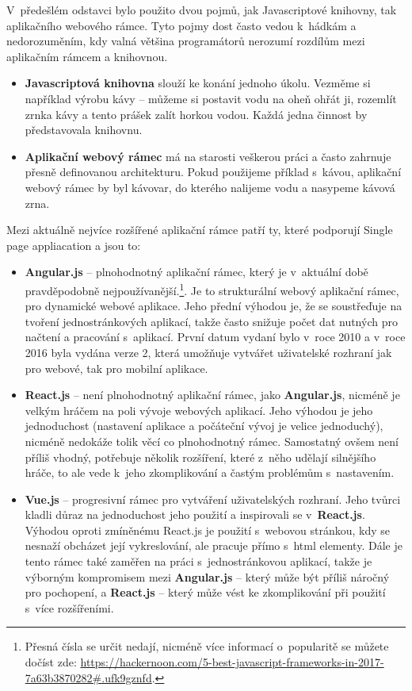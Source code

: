 \par V~předešlém odstavci bylo použito dvou pojmů, jak Javascriptové knihovny, tak aplikačního webového rámce. Tyto pojmy dost často vedou k~hádkám a nedorozuměním, kdy valná většina programátorů nerozumí rozdílům mezi aplikačním rámcem a knihovnou.
\begin{itemize}
\item \textbf{Javascriptová knihovna} slouží ke konání jednoho úkolu. Vezměme si například výrobu kávy -- můžeme si postavit vodu na oheň ohřát ji, rozemlít zrnka kávy a tento prášek zalít horkou vodou. Každá jedna činnost by představovala knihovnu.
\item \textbf{Aplikační webový rámec} má na starosti veškerou práci a často zahrnuje přesně definovanou architekturu. Pokud použijeme příklad s~kávou, aplikační webový rámec by byl kávovar, do kterého nalijeme vodu a nasypeme kávová zrna. \cite{framework-vs-library}
\end{itemize}

\par Mezi aktuálně nejvíce rozšířené aplikační rámce patří ty, které podporují Single page appliacation a jsou to:
\begin{itemize}
\item \textbf{Angular.js} -- plnohodnotný aplikační rámec, který je v~aktuální době pravděpodobně nejpoužívanější.\footnote{Přesná čísla se určit nedají, nicméně více informací o~popularitě se můžete dočíst zde: \url{https://hackernoon.com/5-best-javascript-frameworks-in-2017-7a63b3870282\#.ufk9gznfd}.}. Je to strukturální webový aplikační rámec, pro dynamické webové aplikace. Jeho přední výhodou je, že se soustřeďuje na tvoření jednostránkových aplikací, takže často snižuje počet dat nutných pro načtení a pracování s~aplikací. První datum vydaní bylo v~roce 2010 a v~roce 2016 byla vydána verze 2, která umožňuje vytvářet uživatelské rozhraní jak pro webové, tak pro mobilní aplikace.
\item \textbf{React.js} -- není plnohodnotný aplikační rámec, jako \textbf{Angular.js}, nicméně je velkým hráčem na poli vývoje webových aplikací. Jeho výhodou je jeho jednoduchost (nastavení aplikace a počáteční vývoj je velice jednoduchý), nicméně nedokáže tolik věcí co plnohodnotný rámec. Samostatný ovšem není příliš vhodný, potřebuje několik rozšíření, které z~něho udělají silnějšího hráče, to ale vede k~jeho zkomplikování  a častým problémům s~nastavením.
\item \textbf{Vue.js} -- progresivní rámec pro vytváření uživatelských rozhraní. Jeho tvůrci kladli důraz na jednoduchost jeho použití a inspirovali se v~\textbf{React.js}. Výhodou oproti zmíněnému React.js je použití s~webovou stránkou, kdy se nesnaží obcházet její vykreslování, ale pracuje přímo s~html elementy. Dále je tento rámec také zaměřen na práci s~jednostránkovou aplikací, takže je výborným kompromisem mezi \textbf{Angular.js} -- který může být příliš náročný pro pochopení, a \textbf{React.js} -- který může vést ke zkomplikování při použití s~více rozšířeními.
\end{itemize}

